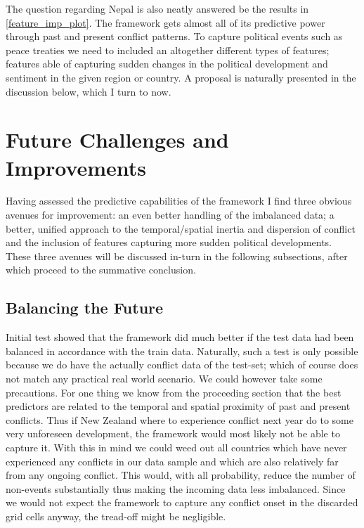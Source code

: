\documentclass[a4paper]{article}
\begin{document}
The question regarding Nepal is also neatly answered be the results in \autoref{feature_imp_plot}. The framework gets almost all of its predictive power through past and present conflict patterns. To capture political events such as peace treaties we need to included an altogether different types of features; features able of capturing sudden changes in the political development and sentiment in the given region or country. A proposal is naturally presented in the discussion below, which I turn to now.\par


\section{Future Challenges and Improvements}

Having assessed the predictive capabilities of the framework I find three obvious avenues for improvement: an even better handling of the imbalanced data; a better, unified approach to the temporal/spatial inertia and dispersion of conflict and the inclusion of features capturing more sudden political developments. These three avenues will be discussed in-turn in the following subsections, after which proceed to the summative conclusion.

\subsection{Balancing the Future}
Initial test showed that the framework did much better if the test data had been balanced in accordance with the train data. Naturally, such a test is only possible because we do have the actually conflict data of the test-set; which of course does not match any practical real world scenario. We could however take some precautions. For one thing we know from the proceeding section that the best predictors are related to the temporal and spatial proximity of past and present conflicts. Thus if New Zealand where to experience conflict next year do to some very unforeseen development, the framework would most likely not be able to capture it. With this in mind we could weed out all countries which have never experienced any conflicts in our data sample and which are also relatively far from any ongoing conflict. This would, with all probability, reduce the number of non-events substantially thus making the incoming data less imbalanced. Since we would not expect the framework to capture any conflict onset in the discarded grid cells anyway, the tread-off might be negligible.\par
\end{document}
